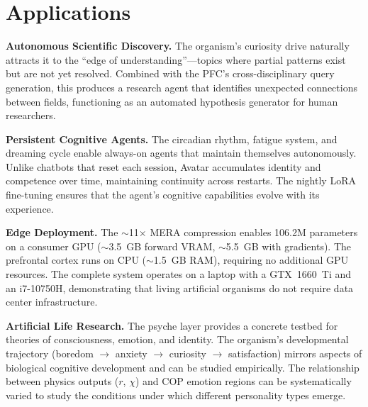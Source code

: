 \documentclass[11pt,a4paper,twocolumn]{article}
\begin{document}


\section{Applications}

\textbf{Autonomous Scientific Discovery.}
The organism's curiosity drive naturally attracts it to the ``edge of understanding''---topics where partial patterns exist but are not yet resolved.
Combined with the PFC's cross-disciplinary query generation, this produces a research agent that identifies unexpected connections between fields, functioning as an automated hypothesis generator for human researchers.

\textbf{Persistent Cognitive Agents.}
The circadian rhythm, fatigue system, and dreaming cycle enable always-on agents that maintain themselves autonomously.
Unlike chatbots that reset each session, Avatar accumulates identity and competence over time, maintaining continuity across restarts.
The nightly LoRA fine-tuning ensures that the agent's cognitive capabilities evolve with its experience.

\textbf{Edge Deployment.}
The $\sim$11$\times$ MERA compression enables 106.2M parameters on a consumer GPU ($\sim$3.5~GB forward VRAM, $\sim$5.5~GB with gradients).
The prefrontal cortex runs on CPU ($\sim$1.5~GB RAM), requiring no additional GPU resources.
The complete system operates on a laptop with a GTX~1660~Ti and an i7-10750H, demonstrating that living artificial organisms do not require data center infrastructure.

\textbf{Artificial Life Research.}
The psyche layer provides a concrete testbed for theories of consciousness, emotion, and identity.
The organism's developmental trajectory (boredom $\to$ anxiety $\to$ curiosity $\to$ satisfaction) mirrors aspects of biological cognitive development and can be studied empirically.
The relationship between physics outputs ($r$, $\chi$) and COP emotion regions can be systematically varied to study the conditions under which different personality types emerge.

\end{document}

